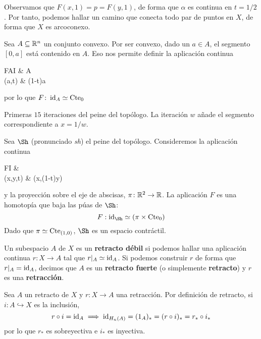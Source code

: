 Observamos que $F(x,1)=p=F(y,1)$, de forma que $\alpha$ es continua en
$t=1/2$. Por tanto, podemos hallar un camino que conecta todo par de puntos en
$X$, de forma que $X$ es arcoconexo.

\begin{example}
Sea $A \subseteq \mathbb{R}^n$ un conjunto convexo. Por ser convexo, dado un $a \in
A$, el segmento $[0,a]$ está contenido en $A$. Eso nos permite definir la
aplicación continua
\begin{diag}
F\colon A\times I \arrow[r] & A                      \\[-0.8cm]
(a,t) \arrow[r, maps to]      & (1-t)a
\end{diag}
por lo que $F\colon \operatorname{id}_A \simeq \operatorname{Cte}_0$
\end{example}

\begin{marginfigure}

\caption[Peine del topólogo.]{ Primeras $15$ iteraciones del
peine del topólogo. La iteración $w$ añade el segmento correspondiente a
$x=1/w$.}
\end{marginfigure}

\begin{example}
Sea $\Sh$ (pronunciado \emph{sh}) el peine del topólogo. Consideremos la
aplicación continua
\begin{diag}
F\colon \Sh\times I \arrow[r]             & \Sh                   \\[-8mm]
(x,y,t) \arrow[r, maps to] & (x,(1-t)y)
\end{diag}
y la proyección sobre el eje de abscisas, $\pi\colon \mathbb{R}^2 \to \mathbb{R}$. La
aplicación $F$ es una homotopía que baja las púas de $\Sh$:
\[F: \id_\Sh \simeq (\pi\times \cte_0)\]
Dado que $\pi \simeq \operatorname{Cte}_{(1,0)}$, $\Sh$ es un espacio contráctil.
\end{example}

\begin{definition}
Un subespacio $A$ de $X$ es un \textbf{retracto débil} si podemos hallar una
aplicación continua $r\colon X \to A$ tal que $r|_A\simeq \operatorname{id}_A$. Si podemos
construir $r$ de forma que $r|_A=\operatorname{id}_A$, decimos que $A$ es un \textbf{retracto
fuerte} (o simplemente \textbf{retracto}) y $r$ es una \textbf{retracción}.
\end{definition}

Sea $A$ un retracto de $X$ y $r\colon X \to A$ una retracción. Por definición de
retracto, si $i\colon A \hookrightarrow X$ es la inclusión,
\[r\circ i=\operatorname{id}_A \implies \operatorname{id}_{H_n(A)}=(1_A)_*=(r\circ i)_*=r_*\circ i_*\]
por lo que $r_*$ es sobreyectiva e $i_*$ es inyectiva.

